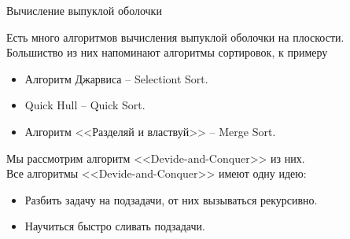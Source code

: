 \documentclass[12pt,aspectratio=169,svgnames]{beamer}
\begin{document}
    \begin{frame}{Вычисление выпуклой оболочки}

        Есть много алгоритмов вычисления выпуклой оболочки на плоскости.
        Большиство из них напоминают алгоритмы сортировок, к примеру

        \begin{itemize}
            \item Алгоритм Джарвиса -- Selectiont Sort.
            \item Quick Hull -- Quick Sort.
            \item Алгоритм <<Разделяй и властвуй>> -- Merge Sort.
        \end{itemize}
        Мы рассмотрим алгоритм <<Devide-and-Conquer>> из них. \\

        Все алгоритмы <<Devide-and-Conquer>> имеют одну идею:

        \begin{itemize}
            \item Разбить задачу на подзадачи, от них вызываться рекурсивно.
            \item Научиться быстро сливать подзадачи.
        \end{itemize}

    \end{frame}
\end{document}
